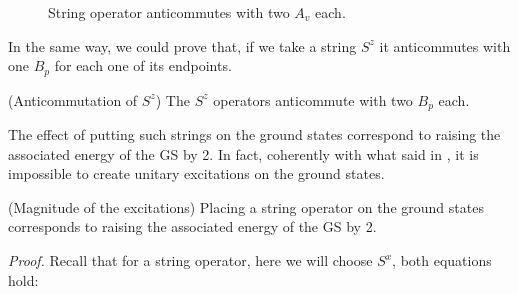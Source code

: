 \documentclass{Configuration_Files/PoliMi3i_thesis}
\begin{document}
\begin{figure}
\begin{center}
	\end{center}
	
	\caption{String operator anticommutes with two $A_v$ each.}
	\label{fig:Av&string}
\end{figure}


In the same way, we could prove that, if we take a string $S^z$ it anticommutes with one $B_p$ for each one of its endpoints.

\begin{proposition}(Anticommutation of $S^z$)
	The $S^z$ operators anticommute with two $B_p$ each.
\end{proposition}

The effect of putting such strings on the ground states correspond to raising the associated energy of the GS by 2. In fact, coherently with what said in {\cite{Her20}}, it is impossible to create unitary excitations on the ground states.

\begin{proposition}(Magnitude of the excitations)
	Placing a string operator on the ground states corresponds to raising the associated energy of the GS by 2.
\end{proposition}

\textit{Proof.} \newline
Recall that for a string operator, here we will choose $S^x$, both equations hold:
\end{document}
